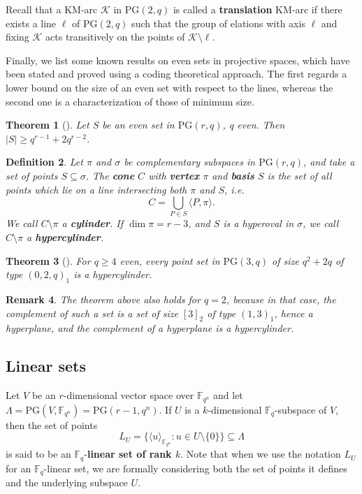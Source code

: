 \documentclass[11pt]{amsart}
\newtheorem{theorem}{Theorem}[section]
\newtheorem{definition}[theorem]{Definition}
\newtheorem{remark}[theorem]{Remark}
\newcommand{\fqn}{\mathbb{F}_{q^n}}
\newcommand{\F}{{\mathbb F}}
\newcommand{\fq}{{\mathbb F}_{q}}
\newcommand{\la}{\langle}
\newcommand{\ra}{\rangle}
\newcommand{\PG}{\mathrm{PG}}
\begin{document}
Recall that a KM-arc $\mathcal{K}$ in $\PG(2,q)$ is called a \textbf{translation} KM-arc if there exists a line $\ell$ of $\PG(2,q)$ such that the group of elations with axis $\ell$ and fixing $\mathcal{K}$ acts transitively on the points of $\mathcal{K}\setminus \ell$.

Finally, we list some known results on even sets in projective spaces, which have been stated and proved using a coding theoretical approach. The first regards a lower bound on the size of an even set with respect to the lines, whereas the second one is a characterization of those of minimum size.

\begin{theorem}[{\cite[Theorem 1]{calkin1999minimumweight}}]
 \label{Th:minimumsizecodeword}
Let $S$ be an even set in $\PG(r,q)$, q even. Then $\lvert S \rvert \geq q^{r-1}+2q^{r-2}$.
\end{theorem}

\begin{definition}
Let $\pi$ and $\sigma$ be complementary subspaces in $\PG(r,q)$, and take a set of points $S \subseteq \sigma$.
The \textbf{cone} $C$ with \textbf{vertex} $\pi$ and \textbf{basis} $S$ is the set of all points which lie on a line intersecting both $\pi$ and $S$, i.e.\
\[
 C = \bigcup_{P \in S} \la P,\pi \ra.
\]
We call $C \setminus \pi$ a \textbf{cylinder}.
If $\dim \pi = r-3$, and $S$ is a hyperoval in $\sigma$, we call $C\setminus \pi$ a \textbf{hypercylinder}.
\end{definition}

\begin{theorem}[{\cite[Proposition 3]{calkin1999minimumweight}}]
\label{th:classconehyperoval}
For $q \geq 4$ even, every point set in $\PG(3,q)$ of size $q^2+2q$ of type $(0,2,q)_1$ is a hypercylinder.
\end{theorem}

\begin{remark}
The theorem above also holds for $q=2$, because in that case, the complement of such a set is a set of size $[3]_2$ of type $(1,3)_1$, hence a hyperplane, and the complement of a hyperplane is a hypercylinder.
\end{remark}

\subsection{Linear sets}

Let $V$ be an $r$-dimensional vector space over $\fqn$ and let $\Lambda=\PG(V,\F_{q^n})=\PG(r-1,q^n)$.
If $U$ is a $k$-dimensional $\fq$-subspace of $V$, then the set of points
\[ L_U=\{\la { u} \ra_{\mathbb{F}_{q^n}} : { u}\in U\setminus \{{ 0} \}\}\subseteq \Lambda \]
is said to be an $\fq$-\textbf{linear set of rank $k$}.
Note that when we use the notation $L_U$ for an $ \fq$-linear set, we are formally considering both the set of points it defines and the underlying subspace $U$.
\end{document}
